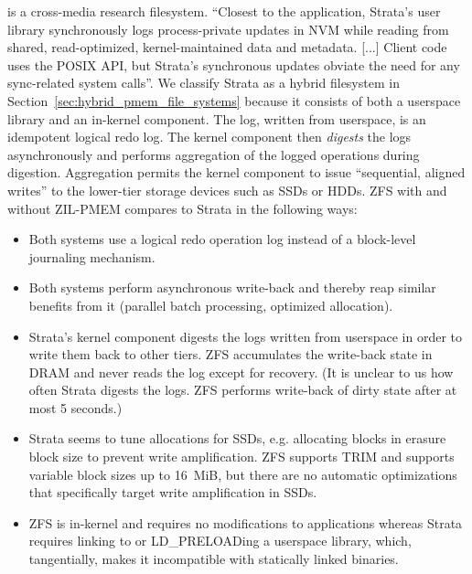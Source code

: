 \documentclass[12pt,a4paper,twoside]{book}
\begin{document}
 is a cross-media research filesystem.
“Closest to the application, Strata’s user library synchronously logs process-private updates in NVM while reading from shared, read-optimized, kernel-maintained data and metadata.
    [...]
Client code uses the POSIX API, but Strata’s synchronous updates obviate the need for any sync-related system calls”.
We classify Strata as a hybrid filesystem in Section~\ref{sec:hybrid_pmem_file_systems} because it consists of both a userspace library and an in-kernel component.
The log, written from userspace, is an idempotent logical redo log.
The kernel component then \textit{digests} the logs asynchronously and performs aggregation of the logged operations during digestion.
Aggregation permits the kernel component to issue “sequential, aligned writes” to the lower-tier storage devices such as SSDs or HDDs.
ZFS with and without ZIL-PMEM compares to Strata in the following ways:
\begin{itemize}[noitemsep,beginpenalty=100000,midpenalty=100000]
    \item Both systems use a logical redo operation log instead of a block-level journaling mechanism.
    \item Both systems perform asynchronous write-back and thereby reap similar benefits from it (parallel batch processing, optimized allocation).
    \item Strata’s kernel component digests the logs written from userspace in order to write them back to other tiers.
          ZFS accumulates the write-back state in DRAM and never reads the log except for recovery.
          (It is unclear to us how often Strata digests the logs. ZFS performs write-back of dirty state after at most 5 seconds.)
    \item Strata seems to tune allocations for SSDs, e.g. allocating blocks in erasure block size to prevent write amplification.
          ZFS supports TRIM and supports variable block sizes up to 16~MiB, but there are no automatic optimizations that specifically target write amplification in SSDs.
    \item ZFS is in-kernel and requires no modifications to applications whereas Strata requires linking to or LD\_PRELOADing a userspace library, which, tangentially, makes it incompatible with statically linked binaries.
\end{itemize}
\end{document}
